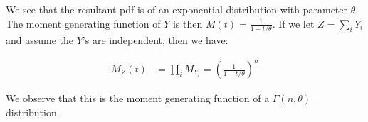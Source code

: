 \documentclass[11pt]{article}
\begin{document}
We see that the resultant pdf is of an exponential distribution with parameter $\theta$.  The moment generating function of $Y$ is then $M(t) = \frac{1}{1-t/\theta}$.  If we let $Z = \sum_i Y_i$ and assume the $Y$'s are independent, then we have:

\begin{align*}
  M_Z(t) &= \prod_i M_{Y_i} = \left( \frac{1}{1-t/\theta} \right)^n
\end{align*}

We observe that this is the moment generating function of a $\Gamma(n, \theta)$ distribution.
\end{document}

